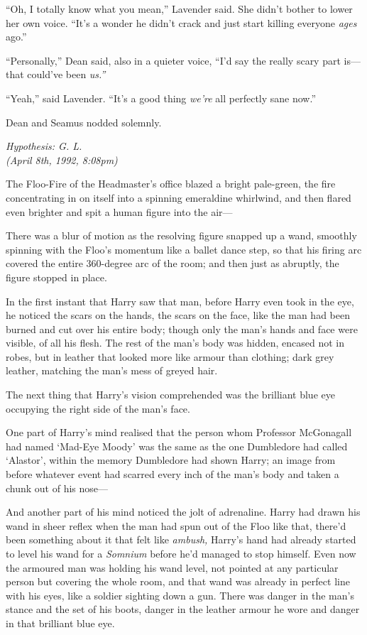 ``Oh, I totally know what you mean,'' Lavender said. She didn't bother
to lower her own voice. ``It's a wonder he didn't crack and just start
killing everyone \emph{ages} ago.''

``Personally,'' Dean said, also in a quieter voice, ``I'd say the really
scary part is---that could've been \emph{us.''}

``Yeah,'' said Lavender. ``It's a good thing \emph{we're} all perfectly
sane now.''

Dean and Seamus nodded solemnly.

\emph{Hypothesis: G. L.}\\\emph{(April 8th, 1992, 8:08pm)}

The Floo-Fire of the Headmaster's office blazed a bright pale-green, the
fire concentrating in on itself into a spinning emeraldine whirlwind,
and then flared even brighter and spit a human figure into the air---

There was a blur of motion as the resolving figure snapped up a wand,
smoothly spinning with the Floo's momentum like a ballet dance step, so
that his firing arc covered the entire 360-degree arc of the room; and
then just as abruptly, the figure stopped in place.

In the first instant that Harry saw that man, before Harry even took in
the eye, he noticed the scars on the hands, the scars on the face, like
the man had been burned and cut over his entire body; though only the
man's hands and face were visible, of all his flesh. The rest of the
man's body was hidden, encased not in robes, but in leather that looked
more like armour than clothing; dark grey leather, matching the man's
mess of greyed hair.

The next thing that Harry's vision comprehended was the brilliant blue
eye occupying the right side of the man's face.

One part of Harry's mind realised that the person whom Professor
McGonagall had named `Mad-Eye Moody' was the same as the one Dumbledore
had called `Alastor', within the memory Dumbledore had shown Harry; an
image from before whatever event had scarred every inch of the man's
body and taken a chunk out of his nose---

And another part of his mind noticed the jolt of adrenaline. Harry had
drawn his wand in sheer reflex when the man had spun out of the Floo
like that, there'd been something about it that felt like \emph{ambush,}
Harry's hand had already started to level his wand for a \emph{Somnium}
before he'd managed to stop himself. Even now the armoured man was
holding his wand level, not pointed at any particular person but
covering the whole room, and that wand was already in perfect line with
his eyes, like a soldier sighting down a gun. There was danger in the
man's stance and the set of his boots, danger in the leather armour he
wore and danger in that brilliant blue eye.

